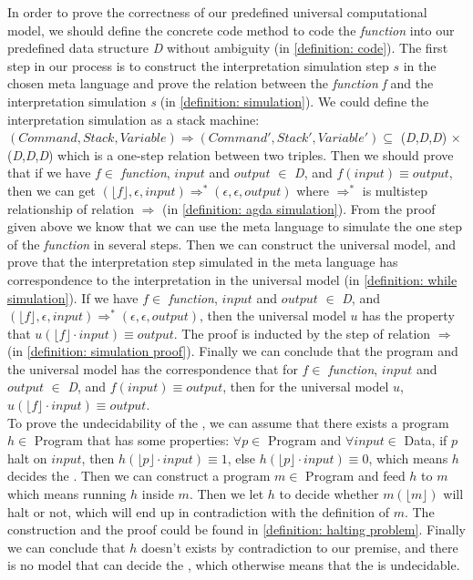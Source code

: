 In order to prove the correctness of our predefined universal computational model, we should define the concrete code method to code the \textit{function} into our predefined data structure \textit{D} without ambiguity (in \ref{definition: code}).
The first step in our process is to construct the interpretation simulation step $s$ in the chosen meta language and prove the relation between the \textit{function} \textit{f} and the interpretation simulation \textit{s} (in \ref{definition: simulation}).
We could define the interpretation simulation as a stack machine: $(Command,Stack,Variable) \Rightarrow (Command',Stack',Variable') \subseteq$ (\textit{D},\textit{D},\textit{D}) $\times$ (\textit{D},\textit{D},\textit{D}) which is a one-step relation between two triples.
Then we should prove that if we have $f \in$ \textit{function}, $input$ and $output$ $\in$ \textit{D}, and $f(input) \equiv output$, then we can get $(\lfloor f\rfloor,\epsilon,input) \Rightarrow^{*} (\epsilon,\epsilon,output)$ where $\Rightarrow^{*}$ is multistep relationship of relation $\Rightarrow$ (in \ref{definition: agda simulation}).
From the proof given above we know that we can use the meta language to simulate the one step of the \textit{function} in several steps.
Then we can construct the universal model, and prove that the interpretation step simulated in the meta language has correspondence to the interpretation in the universal model (in \ref{definition: while simulation}).
If we have $f \in$ \textit{function}, $input$ and $output$ $\in$ \textit{D}, and $(\lfloor f\rfloor,\epsilon,input) \Rightarrow^{*} (\epsilon,\epsilon,output)$, then the universal model $u$ has the property that $u(\lfloor f\rfloor \cdot input) \equiv output$.
The proof is inducted by the step of relation $\Rightarrow$ (in \ref{definition: simulation proof}).
Finally we can conclude that the program and the universal model has the correspondence that for $f \in$ \textit{function}, $input$ and $output$ $\in$ \textit{D}, and $f(input) \equiv output$, then for the universal model $u$,  $u(\lfloor f\rfloor \cdot input) \equiv output$.\\
To prove the undecidability of the , we can assume that there exists a program $h \in$ Program that has some properties: $\forall p \in$ Program and $\forall input \in$ Data, if $p$ halt on $input$, then $h(\lfloor p\rfloor \cdot input) \equiv 1$, else $h(\lfloor p\rfloor \cdot input) \equiv 0$, which means $h$ decides the .
Then we can construct a program $m \in$ Program and feed $h$ to $m$ which means running $h$ inside $m$.
Then we let $h$ to decide whether $m(\lfloor m\rfloor)$ will halt or not, which will end up in contradiction with the definition of $m$.
The construction and the proof could be found in \ref{definition: halting problem}.
Finally we can conclude that $h$ doesn't exists by contradiction to our premise, and there is no model that can decide the , which otherwise means that the  is undecidable.

